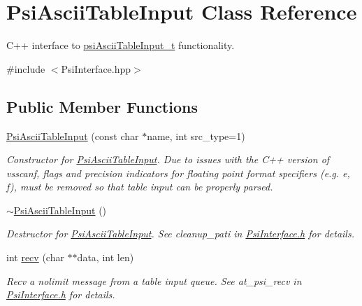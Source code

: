 \hypertarget{classPsiAsciiTableInput}{}\section{Psi\+Ascii\+Table\+Input Class Reference}
\label{classPsiAsciiTableInput}


C++ interface to \hyperlink{structpsiAsciiTableInput__t}{psi\+Ascii\+Table\+Input\+\_\+t} functionality.  




{\ttfamily \#include $<$Psi\+Interface.\+hpp$>$}

\subsection*{Public Member Functions}
\begin{DoxyCompactItemize}
\item 
\hyperlink{classPsiAsciiTableInput_a75626a21362193ab71e53b0e395f8d4c}{Psi\+Ascii\+Table\+Input} (const char $\ast$name, int src\+\_\+type=1)
\begin{DoxyCompactList}\small\item\em Constructor for \hyperlink{classPsiAsciiTableInput}{Psi\+Ascii\+Table\+Input}. Due to issues with the C++ version of vsscanf, flags and precision indicators for floating point format specifiers (e.\+g. e, f), must be removed so that table input can be properly parsed. \end{DoxyCompactList}\item 
\mbox{\label{classPsiAsciiTableInput_abad6b196dddb862f33c760516aa673f0}} 
\hyperlink{classPsiAsciiTableInput_abad6b196dddb862f33c760516aa673f0}{$\sim$\+Psi\+Ascii\+Table\+Input} ()
\begin{DoxyCompactList}\small\item\em Destructor for \hyperlink{classPsiAsciiTableInput}{Psi\+Ascii\+Table\+Input}. See cleanup\+\_\+pati in \hyperlink{PsiInterface_8h_source}{Psi\+Interface.\+h} for details. \end{DoxyCompactList}\item 
int \hyperlink{classPsiAsciiTableInput_ade41e5aa0af9200b81fec07c1512e6a2}{recv} (char $\ast$$\ast$data, int len)
\begin{DoxyCompactList}\small\item\em Recv a nolimit message from a table input queue. See at\+\_\+psi\+\_\+recv in \hyperlink{PsiInterface_8h_source}{Psi\+Interface.\+h} for details. \end{DoxyCompactList}\item 
$$
\end{DoxyCompactItemize}
